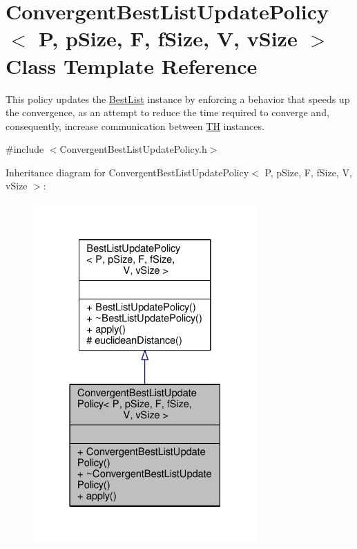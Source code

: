 \hypertarget{classConvergentBestListUpdatePolicy}{}\section{Convergent\+Best\+List\+Update\+Policy$<$ P, p\+Size, F, f\+Size, V, v\+Size $>$ Class Template Reference}
\label{classConvergentBestListUpdatePolicy}


This policy updates the \hyperlink{classBestList}{Best\+List} instance by enforcing a behavior that speeds up the convergence, as an attempt to reduce the time required to converge and, consequently, increase communication between \hyperlink{classTH}{TH} instances.  




{\ttfamily \#include $<$Convergent\+Best\+List\+Update\+Policy.\+h$>$}



Inheritance diagram for Convergent\+Best\+List\+Update\+Policy$<$ P, p\+Size, F, f\+Size, V, v\+Size $>$\+:\nopagebreak
\begin{figure}[H]
\begin{center}
\leavevmode
\includegraphics[width=243pt]{classConvergentBestListUpdatePolicy__inherit__graph}
\end{center}
\end{figure}


